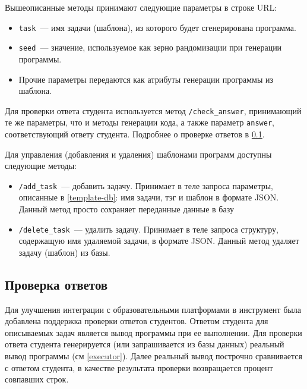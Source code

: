 Вышеописанные методы принимают следующие параметры в строке URL:
\begin{itemize}
    \item \texttt{task}~--- имя задачи (шаблона), из которого будет сгенерирована программа.
    \item \texttt{seed}~--- значение, используемое как зерно рандомизации при генерации программы.
    \item Прочие параметры передаются как атрибуты генерации программы из шаблона.
\end{itemize}

Для проверки ответа студента используется метод \texttt{/check\_answer}, принимающий
те же параметры, что и методы генерации кода, а также параметр \texttt{answer},
соответствующий ответу студента. Подробнее о проверке ответов в \ref{check-answer}.

Для управления (добавления и удаления) шаблонами программ доступны следующие методы:
\begin{itemize}
    \item \texttt{/add\_task}~--- добавить задачу. Принимает в теле запроса параметры, описанные в
          \ref{template-db}: имя задачи, тэг и шаблон в формате JSON. Данный метод просто сохраняет
          переданные данные в базу
    \item \texttt{/delete\_task}~--- удалить задачу. Принимает в теле запроса структуру, содержащую
          имя удаляемой задачи, в формате JSON. Данный метод удаляет задачу (шаблон) из базы.

\end{itemize}

\subsection{Проверка ответов} \label{check-answer}

Для улучшения интеграции с образовательными платформами в инструмент была добавлена
поддержка проверки ответов студентов. Ответом студента для описываемых задач
является вывод программы при ее выполнении. Для проверки ответа студента
генерируется (или запрашивается из базы данных) реальный вывод программы
(см \ref{executor}). Далее реальный вывод построчно сравнивается с ответом студента,
в качестве результата проверки возвращается процент совпавших строк.
